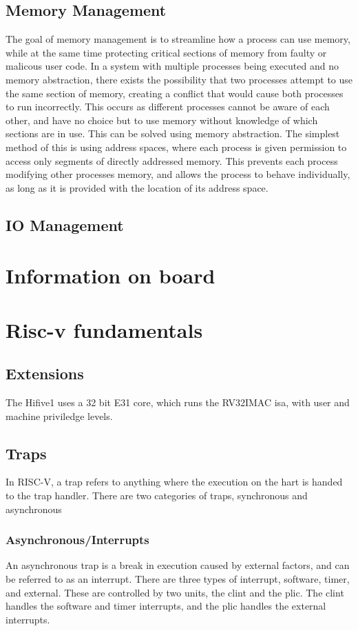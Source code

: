 \subsection{Memory Management}
The goal of memory management is to streamline how a process can use memory, while at the same time protecting critical sections of memory from faulty or malicous user code. In a system with multiple processes being executed and no memory abstraction, there exists the possibility that two processes attempt to use the same section of memory, creating a conflict that would cause both processes to run incorrectly. This occurs as different processes cannot be aware of each other, and have no choice but to use memory without knowledge of which sections are in use. This can be solved using memory abstraction. The simplest method of this is using address spaces, where each process is given permission to access only segments of directly addressed memory. This prevents each process modifying other processes memory, and allows the process to behave individually, as long as it is provided with the location of its address space.\cite{modern_operating}
\subsection{IO Management}
\section{Information on board}
\section{Risc-v fundamentals}
\subsection{Extensions}
The Hifive1 uses a 32 bit E31 core, which runs the RV32IMAC \ac{isa}, with user and machine priviledge levels. 
\subsection{Traps}
In RISC-V, a trap refers to anything where the execution on the hart is handed to the trap handler. There are two categories of traps, synchronous and asynchronous
\subsubsection{Asynchronous/Interrupts}
An asynchronous trap is a break in execution caused by external factors, and can be referred to as an interrupt. There are three types of interrupt, software, timer, and external. These are controlled by two units, the \ac{clint} and the \ac{plic}. The \ac{clint} handles the software and timer interrupts, and the \ac{plic} handles the external interrupts.
